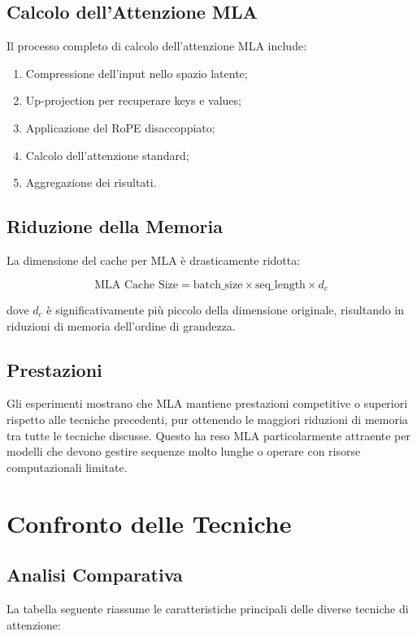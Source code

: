 \subsection{Calcolo dell'Attenzione MLA}
Il processo completo di calcolo dell'attenzione MLA include:

\begin{enumerate}
    \item Compressione dell'input nello spazio latente;
    \item Up-projection per recuperare keys e values;
    \item Applicazione del RoPE disaccoppiato;
    \item Calcolo dell'attenzione standard;
    \item Aggregazione dei risultati.
\end{enumerate}

\subsection{Riduzione della Memoria}
La dimensione del cache per MLA è drasticamente ridotta:

\begin{equation}
    \text{MLA Cache Size} = \text{batch\_size} \times \text{seq\_length} \times d_c
\end{equation}

dove $d_c$ è significativamente più piccolo della dimensione originale, risultando in riduzioni di memoria dell'ordine di grandezza.

\subsection{Prestazioni}
Gli esperimenti mostrano che MLA mantiene prestazioni competitive o superiori rispetto alle tecniche precedenti, pur ottenendo le maggiori riduzioni di memoria tra tutte le tecniche discusse. Questo ha reso MLA particolarmente attraente per modelli che devono gestire sequenze molto lunghe o operare con risorse computazionali limitate.

\section{Confronto delle Tecniche}

\subsection{Analisi Comparativa}
La tabella seguente riassume le caratteristiche principali delle diverse tecniche di attenzione:

